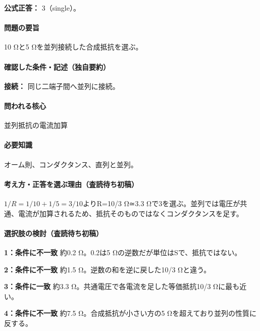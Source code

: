 \textbf{公式正答：} 3（single）。

\paragraph{問題の要旨} 10 Ωと5 Ωを並列接続した合成抵抗を選ぶ。

\paragraph{確認した条件・記述（独自要約）}\mbox{}\par

\noindent\textbf{接続：} 同じ二端子間へ並列に接続。\par

\paragraph{問われる核心} 並列抵抗の電流加算

\paragraph{必要知識} オーム則、コンダクタンス、直列と並列。

\paragraph{考え方・正答を選ぶ理由（査読待ち初稿）} \(1/R=1/10+1/5=3/10\)よりR=\allowbreak{}10/3 Ω≃3.3 Ωで3を選ぶ。並列では電圧が共通、電流が加算されるため、抵抗そのものではなくコンダクタンスを足す。

\paragraph{選択肢の検討（査読待ち初稿）}\mbox{}\par

\noindent\textbf{1：条件に不一致} 約0.2 Ω。0.2は5 Ωの逆数だが単位はSで、抵抗ではない。\par

\noindent\textbf{2：条件に不一致} 約1.5 Ω。逆数の和を逆に戻した10/3 Ωと違う。\par

\noindent\textbf{3：条件に一致} 約3.3 Ω。共通電圧で各電流を足した等価抵抗10/3 Ωに最も近い。\par

\noindent\textbf{4：条件に不一致} 約7.5 Ω。合成抵抗が小さい方の5 Ωを超えており並列の性質に反する。\par

